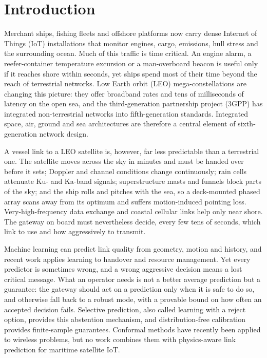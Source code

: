 \section{Introduction}\label{sec:intro}
Merchant ships, fishing fleets and offshore platforms now carry dense Internet of Things (IoT) installations that monitor engines, cargo, emissions, hull stress and the surrounding ocean\cite{xia2020,alqurashi2023,shang2025}. Much of this traffic is time critical. An engine alarm, a reefer-container temperature excursion or a man-overboard beacon is useful only if it reaches shore within seconds, yet ships spend most of their time beyond the reach of terrestrial networks\cite{chen2021ch,nomikos2024}. Low Earth orbit (LEO) mega-constellations are changing this picture: they offer broadband rates and tens of milliseconds of latency on the open sea\cite{kodheli2021,michel2022,laniewski2024}, and the third-generation partnership project (3GPP) has integrated non-terrestrial networks into fifth-generation standards\cite{lin2021}. Integrated space, air, ground and sea architectures are therefore a central element of sixth-generation network design\cite{liu2018,guo2022,hu2026}.

A vessel link to a LEO satellite is, however, far less predictable than a terrestrial one. The satellite moves across the sky in minutes and must be handed over before it sets\cite{wu2019,chen2024ho,chen2026sr}; Doppler and channel conditions change continuously\cite{pan2020,zhu2022}; rain cells attenuate Ku- and Ka-band signals; superstructure masts and funnels block parts of the sky; and the ship rolls and pitches with the sea, so a deck-mounted phased array scans away from its optimum and suffers motion-induced pointing loss\cite{weerackody2006}. Very-high-frequency data exchange and coastal cellular links help only near shore\cite{gomez2018}. The gateway on board must nevertheless decide, every few tens of seconds, which link to use and how aggressively to transmit.

Machine learning can predict link quality from geometry, motion and history, and recent work applies learning to handover and resource management\cite{chen2024ho,chen2026sr}. Yet every predictor is sometimes wrong, and a wrong aggressive decision means a lost critical message. What an operator needs is not a better average prediction but a guarantee: the gateway should act on a prediction only when it is safe to do so, and otherwise fall back to a robust mode, with a provable bound on how often an accepted decision fails. Selective prediction, also called learning with a reject option, provides this abstention mechanism\cite{chow1970,hendrickx2024}, and distribution-free calibration provides finite-sample guarantees\cite{vovk2022,angelopoulos2023,bates2021,angelopoulos2025}. Conformal methods have recently been applied to wireless problems\cite{cohen2023}, but no work combines them with physics-aware link prediction for maritime satellite IoT.

